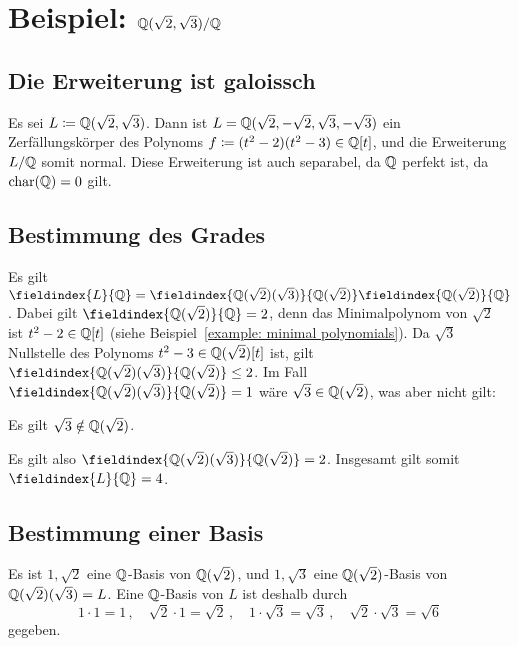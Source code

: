 \section{Beispiel: \texorpdfstring{$\mathbb{Q}(\sqrt{2}, \sqrt{3})/\mathbb{Q}$}{Q(sqrt(2),sqrt(3))/Q}}

\subsection{Die Erweiterung ist galoissch}

Es sei $L \coloneqq \mathbb{Q}(\sqrt{2}, \sqrt{3})$.
Dann ist $L = \mathbb{Q}(\sqrt{2}, -\sqrt{2}, \sqrt{3}, -\sqrt{3})$ ein Zerfällungskörper des Polynoms $f \coloneqq (t^2 - 2)(t^2 - 3) \in \mathbb{Q}[t]$, und die Erweiterung $L/\mathbb{Q}$ somit normal.
Diese Erweiterung ist auch separabel, da $\mathbb{Q}$ perfekt ist, da $\operatorname{char}(\mathbb{Q}) = 0$ gilt.

\subsection{Bestimmung des Grades}

Es gilt $\fieldindex{L}{\Rational} = \fieldindex{\Rational(\sqrt{2})(\sqrt{3})}{\Rational(\sqrt{2})} \fieldindex{\Rational(\sqrt{2})}{\Rational}$.
Dabei gilt $\fieldindex{\Rational(\sqrt{2})}{\Rational} = 2$, denn das Minimalpolynom von $\sqrt{2}$ ist $t^2 - 2 \in \mathbb{Q}[t]$ (siehe Beispiel~\ref{example: minimal polynomials}).
Da $\sqrt{3}$ Nullstelle des Polynoms $t^2 - 3 \in \mathbb{Q}(\sqrt{2})[t]$ ist, gilt $\fieldindex{\Rational(\sqrt{2})(\sqrt{3})}{\Rational(\sqrt{2})} \leq 2$.
Im Fall $\fieldindex{\Rational(\sqrt{2})(\sqrt{3})}{\Rational(\sqrt{2})} = 1$ wäre $\sqrt{3} \in \mathbb{Q}(\sqrt{2})$, was aber nicht gilt:

\begin{lemma}
  Es gilt $\sqrt{3} \notin \mathbb{Q}(\sqrt{2})$.
\end{lemma}

Es gilt also $\fieldindex{\Rational(\sqrt{2})(\sqrt{3})}{\Rational(\sqrt{2})} = 2$.
Insgesamt gilt somit $\fieldindex{L}{\Rational} = 4$.

\subsection{Bestimmung einer Basis}

Es ist $1, \sqrt{2}$ eine $\mathbb{Q}$-Basis von $\mathbb{Q}(\sqrt{2})$, und $1, \sqrt{3}$ eine $\mathbb{Q}(\sqrt{2})$-Basis von $\mathbb{Q}(\sqrt{2})(\sqrt{3}) = L$.
Eine $\mathbb{Q}$-Basis von $L$ ist deshalb durch
\[
  1         \cdot 1         = 1 \,,
  \quad
  \sqrt{2}  \cdot 1         = \sqrt{2}  \,,
  \quad
  1         \cdot \sqrt{3}  = \sqrt{3}  \,,
  \quad
  \sqrt{2}  \cdot \sqrt{3}  = \sqrt{6}
\]
gegeben.


